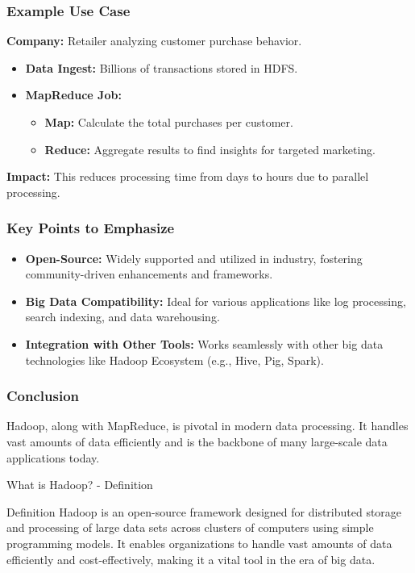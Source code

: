 \documentclass[aspectratio=169]{beamer}
\begin{document}
\begin{frame}[fragile]
    \frametitle{Example Use Case}
    \textbf{Company:} Retailer analyzing customer purchase behavior.
    \begin{itemize}
        \item \textbf{Data Ingest:} Billions of transactions stored in HDFS.
        \item \textbf{MapReduce Job:}
            \begin{itemize}
                \item \textbf{Map:} Calculate the total purchases per customer.
                \item \textbf{Reduce:} Aggregate results to find insights for targeted marketing.
            \end{itemize}
    \end{itemize}
    \textbf{Impact:} This reduces processing time from days to hours due to parallel processing.
\end{frame}

\begin{frame}[fragile]
    \frametitle{Key Points to Emphasize}
    \begin{itemize}
        \item \textbf{Open-Source:} Widely supported and utilized in industry, fostering community-driven enhancements and frameworks.
        \item \textbf{Big Data Compatibility:} Ideal for various applications like log processing, search indexing, and data warehousing.
        \item \textbf{Integration with Other Tools:} Works seamlessly with other big data technologies like Hadoop Ecosystem (e.g., Hive, Pig, Spark).
    \end{itemize}
\end{frame}

\begin{frame}[fragile]
    \frametitle{Conclusion}
    Hadoop, along with MapReduce, is pivotal in modern data processing. It handles vast amounts of data efficiently and is the backbone of many large-scale data applications today.
\end{frame}

\begin{frame}[fragile]{What is Hadoop? - Definition}
    \begin{block}{Definition}
        Hadoop is an open-source framework designed for distributed storage and processing of large data sets across clusters of computers using simple programming models. It enables organizations to handle vast amounts of data efficiently and cost-effectively, making it a vital tool in the era of big data.
    \end{block}
\end{frame}
\end{document}
